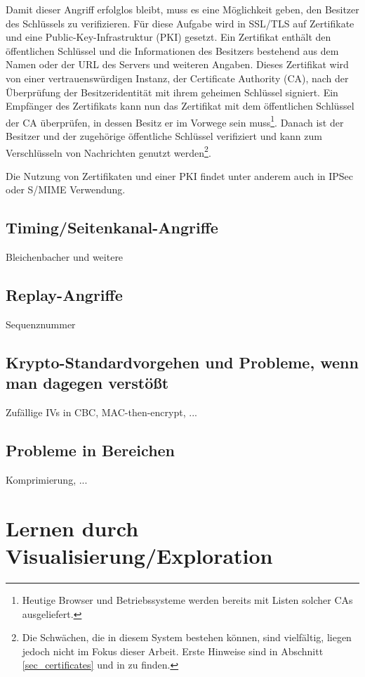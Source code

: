 Damit dieser Angriff erfolglos bleibt, muss es eine Möglichkeit geben, den Besitzer des Schlüssels zu verifizieren. Für diese Aufgabe wird in SSL/TLS auf Zertifikate und eine Public-Key-Infrastruktur (PKI) gesetzt. Ein Zertifikat enthält den öffentlichen Schlüssel und die Informationen des Besitzers bestehend aus dem Namen oder der URL des Servers und weiteren Angaben. Dieses Zertifikat wird von einer vertrauenswürdigen Instanz, der Certificate Authority (CA), nach der Überprüfung der Besitzeridentität mit ihrem geheimen Schlüssel signiert. Ein Empfänger des Zertifikats kann nun das Zertifikat mit dem öffentlichen Schlüssel der CA überprüfen, in dessen Besitz er im Vorwege sein muss\footnote{
	Heutige Browser und Betriebssysteme werden bereits mit Listen solcher CAs ausgeliefert.
}. Danach ist der Besitzer und der zugehörige öffentliche Schlüssel verifiziert und kann zum Verschlüsseln von Nachrichten genutzt werden\footnote{
	Die Schwächen, die in diesem System bestehen können, sind vielfältig, liegen jedoch nicht im Fokus dieser Arbeit. Erste Hinweise sind in Abschnitt \ref{sec_certificates} und in \cite{ferguson10} zu finden.
}. 

Die Nutzung von Zertifikaten und einer PKI findet unter anderem auch in IPSec oder S/MIME Verwendung. 

\subsection{Timing/Seitenkanal-Angriffe}
Bleichenbacher und weitere

\subsection{Replay-Angriffe}
Sequenznummer

\subsection{Krypto-Standardvorgehen und Probleme, wenn man dagegen verstößt}
Zufällige IVs in CBC, MAC-then-encrypt, ...

\subsection{Probleme in  Bereichen}
Komprimierung, ...

\section{Lernen durch Visualisierung/Exploration}

